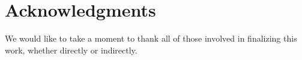 \section*{Acknowledgments}
We would like to take a moment to thank all of those involved in finalizing this work, whether directly or indirectly.

\lipsum[1]

\lipsum[2]

\lipsum[2][1-3]

\newpage
